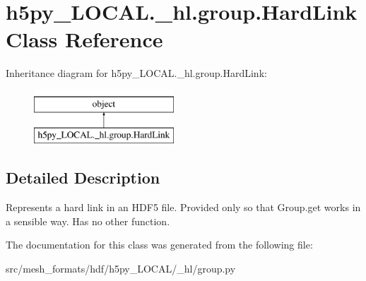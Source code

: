 \hypertarget{classh5py__LOCAL_1_1__hl_1_1group_1_1HardLink}{}\section{h5py\+\_\+\+L\+O\+C\+A\+L.\+\_\+hl.\+group.\+Hard\+Link Class Reference}
\label{classh5py__LOCAL_1_1__hl_1_1group_1_1HardLink}
Inheritance diagram for h5py\+\_\+\+L\+O\+C\+A\+L.\+\_\+hl.\+group.\+Hard\+Link\+:\begin{figure}[H]
\begin{center}
\leavevmode
\includegraphics[height=2.000000cm]{classh5py__LOCAL_1_1__hl_1_1group_1_1HardLink}
\end{center}
\end{figure}


\subsection{Detailed Description}
\begin{DoxyVerb}    Represents a hard link in an HDF5 file.  Provided only so that
    Group.get works in a sensible way.  Has no other function.
\end{DoxyVerb}
 

The documentation for this class was generated from the following file\+:\begin{DoxyCompactItemize}
\item 
src/mesh\+\_\+formats/hdf/h5py\+\_\+\+L\+O\+C\+A\+L/\+\_\+hl/group.\+py\end{DoxyCompactItemize}
